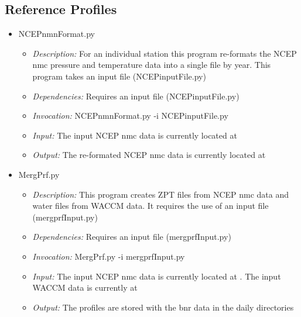 \documentclass[12pt, letterpaper]{article}
\begin{document}
\subsection{Reference Profiles}
\begin{itemize}
\item NCEPnmnFormat.py
\begin{itemize}
\item \textit{Description:} For an individual station this program re-formats the NCEP nmc pressure and temperature data into a single file by year. This program takes an input file (NCEPinputFile.py)
\item \textit{Dependencies:} Requires an input file (NCEPinputFile.py)
\item \textit{Invocation:} NCEPnmnFormat.py -i NCEPinputFile.py
\item \textit{Input:} The input NCEP nmc data is currently located at 
\item \textit{Output:} The re-formated NCEP nmc data is currently located at 
\end{itemize}
\end{itemize}

\begin{itemize}
\item MergPrf.py
\begin{itemize}
\item \textit{Description:} This program creates ZPT files from NCEP nmc data and water files from WACCM data. It requires the use of an input file (mergprfInput.py)
\item \textit{Dependencies:} Requires an input file (mergprfInput.py)
\item \textit{Invocation:} MergPrf.py -i mergprfInput.py
\item \textit{Input:} The input NCEP nmc data is currently located at . The input WACCM data is currently at 
\item \textit{Output:} The profiles are stored with the bnr data in the daily directories 
\end{itemize}
\end{itemize}
\end{document}
